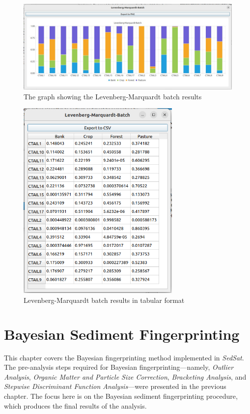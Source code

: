 \documentclass[12pt]{report}
\begin{document}
\begin{figure}[ht]
    \centering
    \includegraphics[width=14cm]{Figures/LL-batch-graph.png}
    \caption{The graph showing the Levenberg-Marquardt batch results}
    \label{fig:LM-Batch-results-graph}
\end{figure}
\FloatBarrier

\begin{figure}[ht]
    \centering
    \includegraphics[width=8cm]{Figures/LL-batch-table.png}
    \caption{Levenberg-Marquardt batch results in tabular format}
    \label{fig:LM-Batch-results-table}
\end{figure}
\FloatBarrier



\chapter{Bayesian Sediment Fingerprinting}
This chapter covers the Bayesian fingerprinting method implemented in \textit{SedSat}. The pre-analysis steps required for Bayesian fingerprinting—namely, \textit{Outlier Analysis}, \textit{Organic Matter and Particle Size Correction}, \textit{Bracketing Analysis}, and \textit{Stepwise Discriminant Function Analysis}—were presented in the previous chapter. The focus here is on the Bayesian sediment fingerprinting procedure, which produces the final results of the analysis.
\end{document}
